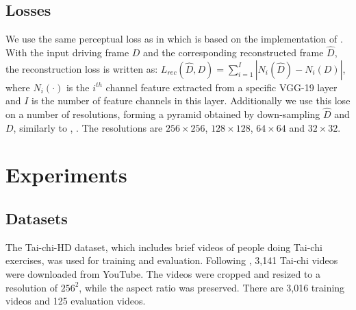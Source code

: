 \documentclass{article}
\begin{document}
\subsection{Losses}
We use the same perceptual loss as in \cite{siarohin2020order} which is
based on the implementation of \cite{wang2018videotovideo}. With the input
driving frame $D$ and the corresponding reconstructed frame $\hat{D}$, the
reconstruction loss is written as: $L_{rec}(\hat{D}, D) =
\sum_{i=1}^{I} |N_i(\hat{D})-N_i(D)|$, where $N_i(\cdot)$ is the $i^{th}$
channel feature extracted from a specific VGG-19 layer \cite{simonyan2015deep}
and $I$ is the number of feature channels in this layer. Additionally we use this lose on
a number of resolutions, forming a pyramid obtained by down-sampling
$\hat{D}$ and $D$, similarly to \cite{}, \cite{}. The resolutions are $256
\times 256$, $128 \times 128$, $64 \times 64$ and $32 \times 32$.


\section{Experiments}
\subsection{Datasets}
The Tai-chi-HD dataset, which includes brief videos of people doing Tai-chi
exercises, was used for training and evaluation. Following
\cite{siarohin2020order}, 3,141 Tai-chi videos were downloaded from YouTube.
The videos were cropped and resized to a resolution of $256^2$, while the
aspect ratio was preserved. There are 3,016 training videos and 125
evaluation videos.
\end{document}
